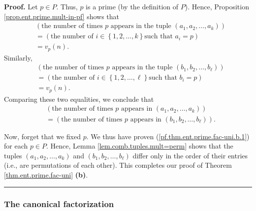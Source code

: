 \documentclass[numbers=enddot,12pt,final,onecolumn,notitlepage]{scrartcl}%
\numberwithin{exer}{subsection}
\theoremstyle{definition}
\newenvironment{proof}[1][Proof]{\noindent\textbf{#1.} }{\ \rule{0.5em}{0.5em}}
\begin{document}
\begin{proof}
Let $p\in P$. Thus, $p$ is a prime (by the definition of $P$). Hence,
Proposition \ref{prop.ent.prime.mult-in-pf} shows that%
\begin{align*}
&  \left(  \text{the number of times }p\text{ appears in the tuple }\left(
a_{1},a_{2},\ldots,a_{k}\right)  \right) \\
&  =\left(  \text{the number of }i\in\left\{  1,2,\ldots,k\right\}  \text{
such that }a_{i}=p\right) \\
&  =v_{p}\left(  n\right)  .
\end{align*}
Similarly,%
\begin{align*}
&  \left(  \text{the number of times }p\text{ appears in the tuple }\left(
b_{1},b_{2},\ldots,b_{\ell}\right)  \right) \\
&  =\left(  \text{the number of }i\in\left\{  1,2,\ldots,\ell\right\}  \text{
such that }b_{i}=p\right) \\
&  =v_{p}\left(  n\right)  .
\end{align*}
Comparing these two equalities, we conclude that
\begin{align}
&  \left(  \text{the number of times }p\text{ appears in }\left(  a_{1}%
,a_{2},\ldots,a_{k}\right)  \right) \nonumber\\
&  =\left(  \text{the number of times }p\text{ appears in }\left(  b_{1}%
,b_{2},\ldots,b_{\ell}\right)  \right)  . \label{pf.thm.ent.prime.fac-uni.b.1}%
\end{align}


Now, forget that we fixed $p$. We thus have proven
(\ref{pf.thm.ent.prime.fac-uni.b.1}) for each $p\in P$. Hence, Lemma
\ref{lem.comb.tuples.mult=perm} shows that the tuples $\left(  a_{1}%
,a_{2},\ldots,a_{k}\right)  $ and $\left(  b_{1},b_{2},\ldots,b_{\ell}\right)
$ differ only in the order of their entries (i.e., are permutations of each
other). This completes our proof of Theorem \ref{thm.ent.prime.fac-uni}
\textbf{(b)}.
\end{proof}

\subsubsection{The canonical factorization}
\end{document}
